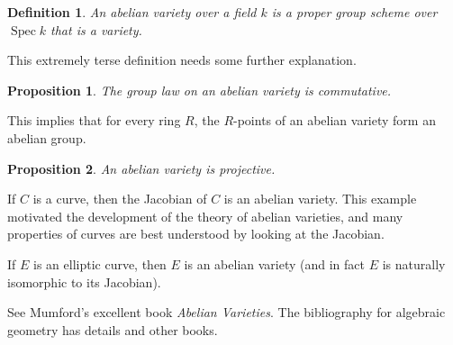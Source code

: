 \documentclass[12pt]{article}
\newtheorem{defn}{Definition}
\newtheorem{prop}{Proposition}
\begin{document}
\begin{defn}
An \emph{abelian variety} over a field $k$ is a proper group scheme over $\operatorname{Spec} k$ that is a variety. 
\end{defn}

This extremely terse definition needs some further explanation.

\begin{prop}
The group law on an abelian variety is commutative.
\end{prop}
This implies that for every ring $R$, the $R$-points of an abelian variety form an abelian group. 
\begin{prop}
An abelian variety is projective. 
\end{prop}

If $C$ is a curve, then the Jacobian of $C$ is an abelian variety.  This example motivated the development of the theory of abelian varieties, and many properties of curves are best understood by looking at the Jacobian. 

If $E$ is an elliptic curve, then $E$ is an abelian variety (and in fact $E$ is naturally isomorphic to its Jacobian).

See Mumford's excellent book \emph{Abelian Varieties}.  The bibliography for algebraic geometry has details and other books.
\end{document}
